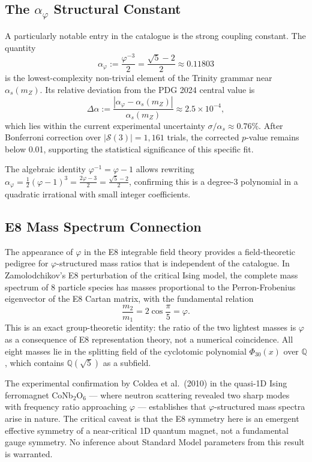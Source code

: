 \subsection{The \(\alpha_\varphi\) Structural Constant}

A particularly notable entry in the catalogue is the strong coupling constant. The quantity
\[\alpha_\varphi := \frac{\varphi^{-3}}{2} = \frac{\sqrt{5} - 2}{2} \approx 0.11803\]
is the lowest-complexity non-trivial element of the Trinity grammar near \(\alpha_s(m_Z)\). Its relative deviation from the PDG 2024 central value is
\[\Delta\alpha := \frac{|\alpha_\varphi - \alpha_s(m_Z)|}{\alpha_s(m_Z)} \approx 2.5 \times 10^{-4},\]
which lies within the current experimental uncertainty \(\sigma/\alpha_s \approx 0.76\%\). After Bonferroni correction over \(|\mathcal{S}(3)| = 1{,}161\) trials, the corrected \(p\)-value remains below 0.01, supporting the statistical significance of this specific fit.

The algebraic identity \(\varphi^{-1} = \varphi - 1\) allows rewriting \(\alpha_\varphi = \frac{1}{2}(\varphi - 1)^3 = \frac{2\varphi - 3}{2} = \frac{\sqrt{5} - 2}{2}\), confirming this is a degree-3 polynomial in a quadratic irrational with small integer coefficients.

\subsection{E8 Mass Spectrum Connection}

The appearance of \(\varphi\) in the E8 integrable field theory provides a field-theoretic pedigree for \(\varphi\)-structured mass ratios that is independent of the catalogue. In Zamolodchikov's E8 perturbation of the critical Ising model, the complete mass spectrum of 8 particle species has masses proportional to the Perron-Frobenius eigenvector of the E8 Cartan matrix, with the fundamental relation
\[\frac{m_2}{m_1} = 2\cos\frac{\pi}{5} = \varphi.\]
This is an exact group-theoretic identity: the ratio of the two lightest masses is \(\varphi\) as a consequence of E8 representation theory, not a numerical coincidence. All eight masses lie in the splitting field of the cyclotomic polynomial \(\Phi_{30}(x)\) over \(\mathbb{Q}\), which contains \(\mathbb{Q}(\sqrt{5})\) as a subfield.

The experimental confirmation by Coldea et al.~(2010) in the quasi-1D Ising ferromagnet CoNb\(_2\)O\(_6\) --- where neutron scattering revealed two sharp modes with frequency ratio approaching \(\varphi\) --- establishes that \(\varphi\)-structured mass spectra arise in nature. The critical caveat is that the E8 symmetry here is an emergent effective symmetry of a near-critical 1D quantum magnet, not a fundamental gauge symmetry. No inference about Standard Model parameters from this result is warranted.

